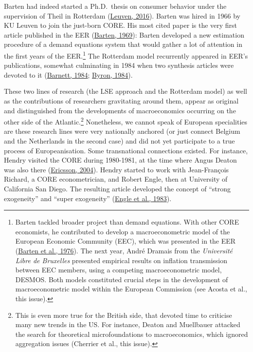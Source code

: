 \documentclass[
  12pt,
  onecolumn]{article}
\begin{document}
Barten had indeed started a Ph.D.~thesis on consumer behavior under the
supervision of Theil in Rotterdam
(\protect\hyperlink{ref-kuleuven2016}{Leuven, 2016}). Barten was hired
in 1966 by KU Leuven to join the just-born CORE. His most cited paper is
the very first article published in the EER
(\protect\hyperlink{ref-barten1969}{Barten, 1969}): Barten developed a
new estimation procedure of a demand equations system that would gather
a lot of attention in the first years of the EER.\footnote{Barten
  tackled broader project than demand equations. With other CORE
  economists, he contributed to develop a macroeconometric model of the
  European Economic Community (EEC), which was presented in the EER
  (\protect\hyperlink{ref-barten1976}{Barten et al., 1976}). The next
  year, André Dramais from the \emph{Université Libre de Bruxelles}
  presented empirical results on inflation transmission between EEC
  members, using a competing macroeconometric model, DESMOS. Both models
  constituted crucial steps in the development of macroeconometric model
  within the European Commission (see Acosta et al., this issue).} The
Rotterdam model recurrently appeared in EER's publications, somewhat
culminating in 1984 when two synthesis articles were devoted to it
(\protect\hyperlink{ref-barnett1984}{Barnett, 1984};
\protect\hyperlink{ref-byron1984}{Byron, 1984}).

These two lines of research (the LSE approach and the Rotterdam model)
as well as the contributions of researchers gravitating around them,
appear as original and distinguished from the developments of
macroeconomics occurring on the other side of the Atlantic.\footnote{This
  is even more true for the British side, that devoted time to criticise
  many new trends in the US. For instance, Deaton and Muellbauer
  attacked the search for theoretical microfoundations to
  macroeconomics, which ignored aggregation issues (Cherrier et al.,
  this issue).} Nonetheless, we cannot speak of European specialities
are these research lines were very nationally anchored (or just connect
Belgium and the Netherlands in the second case) and did not yet
participate to a true process of Europeanisation. Some transnational
connections existed. For instance, Hendry visited the CORE during
1980-1981, at the time where Angus Deaton was also there
(\protect\hyperlink{ref-ericsson2004}{Ericsson, 2004}). Hendry started
to work with Jean-François Richard, a CORE econometrician, and Robert
Engle, then at University of California San Diego. The resulting article
developed the concept of ``strong exogeneity'' and ``super exogeneity''
(\protect\hyperlink{ref-engle1983}{Engle et al., 1983}).
\end{document}
